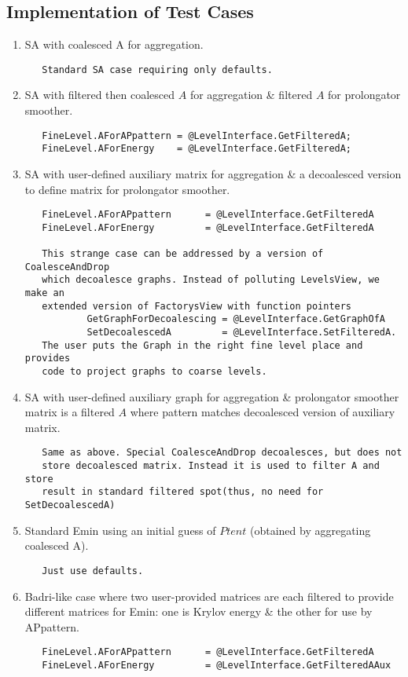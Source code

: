 \documentclass{siamltex}
\numberwithin{algorithm}{section}  %
\begin{document}
\subsection{Implementation of Test Cases}
\begin{enumerate}
\item SA with coalesced A for aggregation.
   \begin{verbatim}
   Standard SA case requiring only defaults.
   \end{verbatim}
\item SA with filtered then coalesced $A$ for aggregation \& filtered $A$ for
   prolongator smoother.\\
   \begin{verbatim}
   FineLevel.AForAPpattern = @LevelInterface.GetFilteredA;
   FineLevel.AForEnergy    = @LevelInterface.GetFilteredA;
   \end{verbatim}
\item SA with user-defined auxiliary matrix for aggregation \& a decoalesced
   version to define matrix for prolongator smoother.\\
   \begin{verbatim}
   FineLevel.AForAPpattern      = @LevelInterface.GetFilteredA
   FineLevel.AForEnergy         = @LevelInterface.GetFilteredA

   This strange case can be addressed by a version of CoalesceAndDrop
   which decoalesce graphs. Instead of polluting LevelsView, we make an
   extended version of FactorysView with function pointers
           GetGraphForDecoalescing = @LevelInterface.GetGraphOfA
           SetDecoalescedA         = @LevelInterface.SetFilteredA.
   The user puts the Graph in the right fine level place and provides
   code to project graphs to coarse levels.
   \end{verbatim}
\item SA with user-defined auxiliary graph for aggregation \&
   prolongator smoother matrix is a filtered $A$ where pattern
   matches decoalesced version of auxiliary matrix.
   \begin{verbatim}
   Same as above. Special CoalesceAndDrop decoalesces, but does not
   store decoalesced matrix. Instead it is used to filter A and store 
   result in standard filtered spot(thus, no need for SetDecoalescedA)
   \end{verbatim}
\item Standard Emin using an initial guess of $Ptent$ (obtained by aggregating
   coalesced A).
   \begin{verbatim}
   Just use defaults.
   \end{verbatim}
\item Badri-like case where two user-provided matrices are each filtered
      to provide different matrices for Emin: one is Krylov
      energy \& the other for use by APpattern.
   \begin{verbatim}
   FineLevel.AForAPpattern      = @LevelInterface.GetFilteredA
   FineLevel.AForEnergy         = @LevelInterface.GetFilteredAAux


\end{verbatim}
\end{enumerate}
\end{document}
